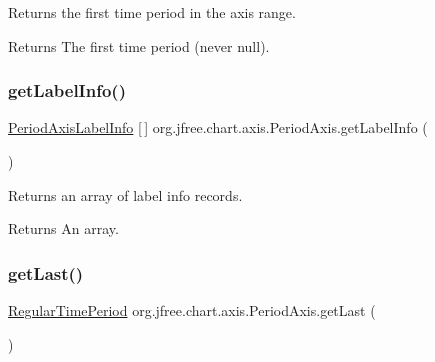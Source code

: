 Returns the first time period in the axis range.

\begin{DoxyReturn}{Returns}
The first time period (never {\ttfamily null}). 
\end{DoxyReturn}
\mbox{\label{classorg_1_1jfree_1_1chart_1_1axis_1_1_period_axis_a539a0057f3eb84813bd6ac2011fd65d3}} 
\subsubsection{\texorpdfstring{get\+Label\+Info()}{getLabelInfo()}}
{\footnotesize\ttfamily \mbox{\hyperlink{classorg_1_1jfree_1_1chart_1_1axis_1_1_period_axis_label_info}{Period\+Axis\+Label\+Info}} \mbox{[}$\,$\mbox{]} org.\+jfree.\+chart.\+axis.\+Period\+Axis.\+get\+Label\+Info (\begin{DoxyParamCaption}{ }\end{DoxyParamCaption})}

Returns an array of label info records.

\begin{DoxyReturn}{Returns}
An array. 
\end{DoxyReturn}
\mbox{\label{classorg_1_1jfree_1_1chart_1_1axis_1_1_period_axis_abc4bc9a48d98ead7b3e24031ac001ea2}} 
\subsubsection{\texorpdfstring{get\+Last()}{getLast()}}
{\footnotesize\ttfamily \mbox{\hyperlink{classorg_1_1jfree_1_1data_1_1time_1_1_regular_time_period}{Regular\+Time\+Period}} org.\+jfree.\+chart.\+axis.\+Period\+Axis.\+get\+Last (\begin{DoxyParamCaption}{ }\end{DoxyParamCaption})}

